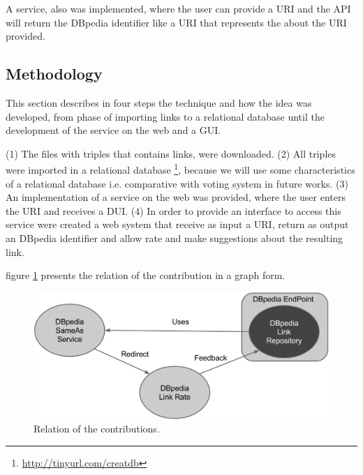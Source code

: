 A service, also was implemented, where the user can provide a URI and the API will return the DBpedia identifier like a URI that represents the  about the URI provided.

\subsection{Methodology}
This section describes in four steps the technique and how the idea was developed, from phase of importing links to a relational database until the development of the service on the web and a GUI.

(1) The files with triples that contains  links, were downloaded.
(2) All triples were imported in a relational database \footnote{\url{http://tinyurl.com/creatdb}}, because we will use some characteristics of a relational database i.e. comparative with voting system in future works.
(3) An implementation of a service on the web was provided, where the user enters the URI and receives a DUI.
(4) In order to provide an interface to access this service were created a web system that receive as input a URI, return as output an DBpedia identifier and allow rate and make suggestions about the resulting link.


figure \ref{fig:contrib} presents the relation of the contribution in a graph form.

\begin{figure}[hbt] 
  	\centering
	\includegraphics[width=\columnwidth]{img/contribution.png}
  	\caption{Relation of the contributions.}
  	\label{fig:contrib}
\end{figure}

